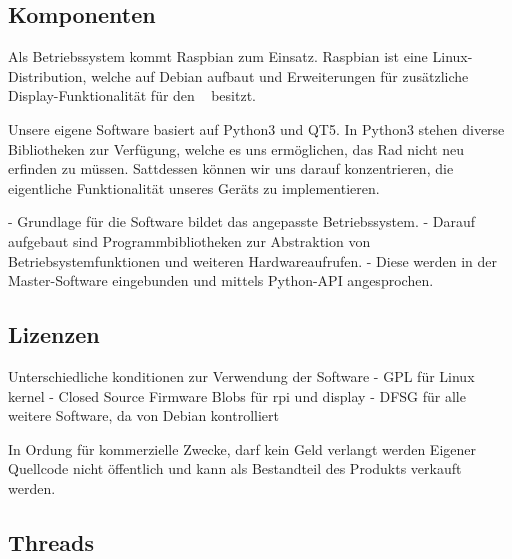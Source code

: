 \subsection{Komponenten}
\label{subsec:software:master:components}

Als   Betriebssystem   kommt   Raspbian   zum   Einsatz. Raspbian   ist   eine
Linux-Distribution,  welche auf  Debian   aufbaut  und
Erweiterungen f\"ur  zus\"atzliche Display-Funktionalit\"at f\"ur  den \Raspi~
besitzt.

Unsere eigene Software basiert auf  Python3 und QT5. In Python3 stehen diverse
Bibliotheken   zur  Verf\"ugung,  welche  es uns  erm\"oglichen,
das  Rad  nicht   neu  erfinden  zu  m\"ussen. Sattdessen   k\"onnen  wir  uns
darauf  konzentrieren, die  eigentliche Funktionalit\"at  unseres Ger\"ats  zu
implementieren.



 - Grundlage für die Software bildet das angepasste Betriebssystem.
 - Darauf aufgebaut sind Programmbibliotheken zur Abstraktion von Betriebsystemfunktionen und weiteren Hardwareaufrufen.
 - Diese werden in der Master-Software eingebunden und mittels Python-API angesprochen.


\subsection{Lizenzen}
\label{subsec:software:master:licenses}

Unterschiedliche konditionen zur Verwendung der Software
 - GPL für Linux kernel
 - Closed Source Firmware Blobs für rpi und display
 - DFSG für alle weitere Software, da von Debian kontrolliert

In Ordung für kommerzielle Zwecke, darf kein Geld verlangt werden
Eigener Quellcode nicht öffentlich und kann als Bestandteil des Produkts verkauft werden.


\subsection{Threads}
\label{subsec:software:master:threads}

